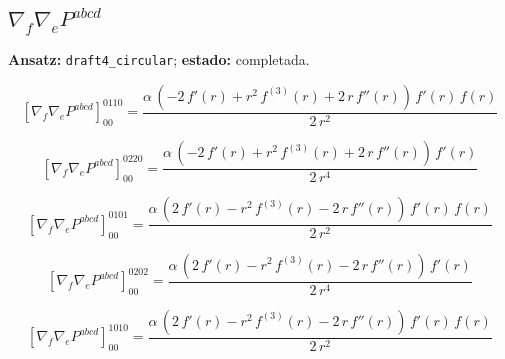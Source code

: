 \documentclass[11pt]{article}
\begin{document}
\subsection*{$ \nabla_f\nabla_e P^{abcd} $}
\textbf{Ansatz:} \texttt{draft4\_circular}; \textbf{estado:} completada.\par
\begin{dmath*}[breakdepth={5}]
\left[\nabla_f\nabla_e P^{abcd}\right]_{00}^{0110} = \frac{\alpha\,\left(-2\,f'\!\left(r\right) + {r}^{2}\,f^{(3)}\!\left(r\right) + 2\,r\,f''\!\left(r\right)\right)\,f'\!\left(r\right)\,f\!\left(r\right)}{2\,{r}^{2}}
\end{dmath*}
\par\smallskip
\begin{dmath*}[breakdepth={5}]
\left[\nabla_f\nabla_e P^{abcd}\right]_{00}^{0220} = \frac{\alpha\,\left(-2\,f'\!\left(r\right) + {r}^{2}\,f^{(3)}\!\left(r\right) + 2\,r\,f''\!\left(r\right)\right)\,f'\!\left(r\right)}{2\,{r}^{4}}
\end{dmath*}
\par\smallskip
\begin{dmath*}[breakdepth={5}]
\left[\nabla_f\nabla_e P^{abcd}\right]_{00}^{0101} = \frac{\alpha\,\left(2\,f'\!\left(r\right) - {r}^{2}\,f^{(3)}\!\left(r\right) - 2\,r\,f''\!\left(r\right)\right)\,f'\!\left(r\right)\,f\!\left(r\right)}{2\,{r}^{2}}
\end{dmath*}
\par\smallskip
\begin{dmath*}[breakdepth={5}]
\left[\nabla_f\nabla_e P^{abcd}\right]_{00}^{0202} = \frac{\alpha\,\left(2\,f'\!\left(r\right) - {r}^{2}\,f^{(3)}\!\left(r\right) - 2\,r\,f''\!\left(r\right)\right)\,f'\!\left(r\right)}{2\,{r}^{4}}
\end{dmath*}
\par\smallskip
\begin{dmath*}[breakdepth={5}]
\left[\nabla_f\nabla_e P^{abcd}\right]_{00}^{1010} = \frac{\alpha\,\left(2\,f'\!\left(r\right) - {r}^{2}\,f^{(3)}\!\left(r\right) - 2\,r\,f''\!\left(r\right)\right)\,f'\!\left(r\right)\,f\!\left(r\right)}{2\,{r}^{2}}
\end{dmath*}
\end{document}
